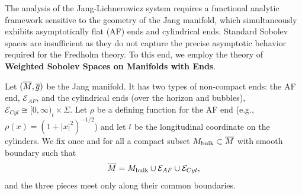 The analysis of the Jang-Lichnerowicz system requires a functional analytic framework sensitive to the geometry of the Jang manifold, which simultaneously exhibits asymptotically flat (AF) ends and cylindrical ends. Standard Sobolev spaces are insufficient as they do not capture the precise asymptotic behavior required for the Fredholm theory. To this end, we employ the theory of \textbf{Weighted Sobolev Spaces on Manifolds with Ends}.

Let $(\overline{M}, \overline{g})$ be the Jang manifold. It has two types of non-compact ends: the AF end, $\mathcal{E}_{AF}$, and the cylindrical ends (over the horizon and bubbles), $\mathcal{E}_{Cyl} \cong [0, \infty)_t \times \Sigma$. Let $\rho$ be a defining function for the AF end (e.g., $\rho(x) = (1+|x|^2)^{-1/2}$) and let $t$ be the longitudinal coordinate on the cylinders. We fix once and for all a compact subset $M_{\mathrm{bulk}}\subset\overline{M}$ with smooth boundary such that
\[
\overline{M} = M_{\mathrm{bulk}} \cup \mathcal{E}_{AF} \cup \mathcal{E}_{Cyl},
\]
and the three pieces meet only along their common boundaries.

